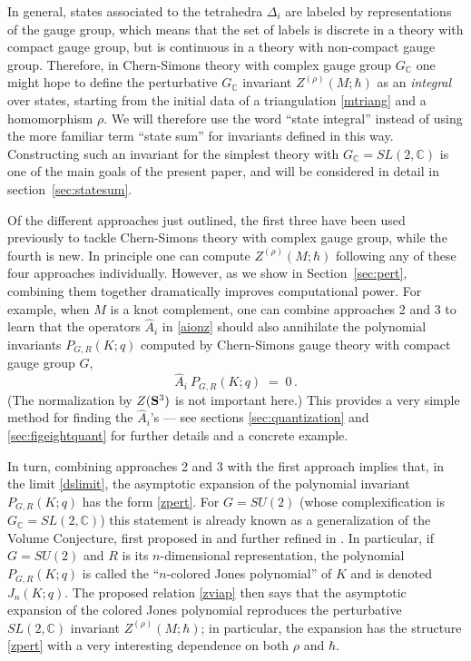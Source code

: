 \documentclass[hyper]{JHEP3}
\newcommand{\C}{{\mathbb{C}}}
\newcommand\be{\begin{equation}}
\newcommand\ee{\end{equation}}
\def\={\;=\;}
\begin{document}
\begin{itemize}
In general, states associated to the tetrahedra $\Delta_i$
are labeled by representations of the gauge group, which means
that the set of labels is discrete in a theory with compact gauge
group, but is continuous in a theory with non-compact gauge group.
Therefore, in Chern-Simons theory with complex gauge group $G_{\C}$
one might hope to define the perturbative $G_{\C}$ invariant $Z^{(\rho)} (M;\hbar)$
as an {\it integral} over states, starting from the initial data of
a triangulation \eqref{mtriang} and a homomorphism $\rho$.
We will therefore use the word ``state integral'' instead of
using the more familiar term ``state sum'' for invariants defined in this way.
Constructing such an invariant for the simplest theory with $G_{\C} = SL(2,\C)$
is one of the main goals of the present paper, and will be considered
in detail in section~\ref{sec:statesum}.

\end{itemize}
Of the different approaches just outlined, the first three have been used previously
to tackle Chern-Simons theory with complex gauge group, while the fourth is new.
In principle one can compute $Z^{(\rho)} (M;\hbar)$ following any
of these four approaches individually.
However, as we show in Section~\ref{sec:pert},
combining them together dramatically improves computational power.
For example, when $M$ is a knot complement, one can combine approaches 2 and 3
to learn that the operators $\widehat{A}_i$ in \eqref{aionz} should also
annihilate the polynomial invariants $P_{G,R} (K;q)$ computed by
Chern-Simons gauge theory with compact gauge group $G$,
\be
\widehat{A}_i ~P_{G,R} (K;q) \= 0\,.
\label{aionp}
\ee
(The normalization by $Z({\bf S}^3)$ is not important here.)
This provides a very simple method for finding the $\widehat{A}_i$'s
--- see sections \ref{sec:quantization} and \ref{sec:figeightquant}
for further details and a concrete example.

In turn, combining approaches 2 and 3 with the first approach implies
that, in the limit \eqref{dslimit}, the asymptotic expansion
of the polynomial invariant $P_{G,R} (K;q)$ has the form \eqref{zpert}.
For $G = SU(2)$ (whose complexification is $G_{\C} = SL(2,\C)$)
this statement is already known as a generalization
of the Volume Conjecture, first proposed in \cite{gukov-2003}
and further refined in \cite{murakami-2006,gukov-2006}.
In particular, if $G=SU(2)$ and $R$ is its $n$-dimensional representation,
the polynomial $P_{G,R} (K;q)$ is called the ``$n$-colored Jones polynomial''
of $K$ and is denoted $J_n (K;q)$.
The proposed relation \eqref{zviap} then says that
the asymptotic expansion of the colored Jones polynomial
reproduces the perturbative $SL(2,\C)$ invariant $Z^{(\rho)} (M;\hbar)$;
in particular,
the expansion has the structure \eqref{zpert} with a very interesting
dependence on both $\rho$ and $\hbar$.
\end{document}
